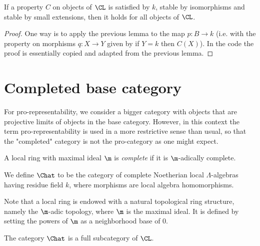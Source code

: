 \begin{lemma}
  \label{lem:smallext_obj_induction}
  \leanok
  If a property $C$ on objects of $\CL$ is satisfied by $k$,
  stable by isomorphisms
  and stable by small extensions, then
  it holds for all objects of $\CL$.
\end{lemma}

\begin{proof}
  \leanok
  One way is to apply the previous lemma to the map $p : B \to k$
  (i.e. with the property on morphisms $q : X \to Y$ given by if $Y = k$ then $C (X)$).
  In the code the proof is essentially copied and adapted from the previous lemma.
\end{proof}

\section{Completed base category}

For pro-representability, we consider a bigger category with objects
that are projective limits of objects in the base category.
However, in this context the term pro-representability is used in a
more restrictive sense than usual, so that the "completed" category
is not the pro-category as one might expect.

\begin{definition}
  \label{def:complete}
  \leanok
  A local ring with maximal ideal $\m$
  is \emph{complete} if it is $\m$-adically complete.
\end{definition}

\begin{definition}
  \label{def:ProArtinResAlg}
  \leanok
  We define $\Chat$ to be the category of complete Noetherian local
  $\Lambda$-algebras having residue field $k$,
  where morphisms are local algebra homomorphisms.
\end{definition}

Note that a local ring is endowed with a natural topological ring structure,
namely the $\m$-adic topology, where $\m$ is the maximal ideal.
It is defined by setting the powers of $\m$
as a neighborhood base of $0$.

\begin{lemma}
  \label{lem:fullsubcategory}
  \leanok
  The category $\Chat$ is a full subcategory of $\CL$.
\end{lemma}

